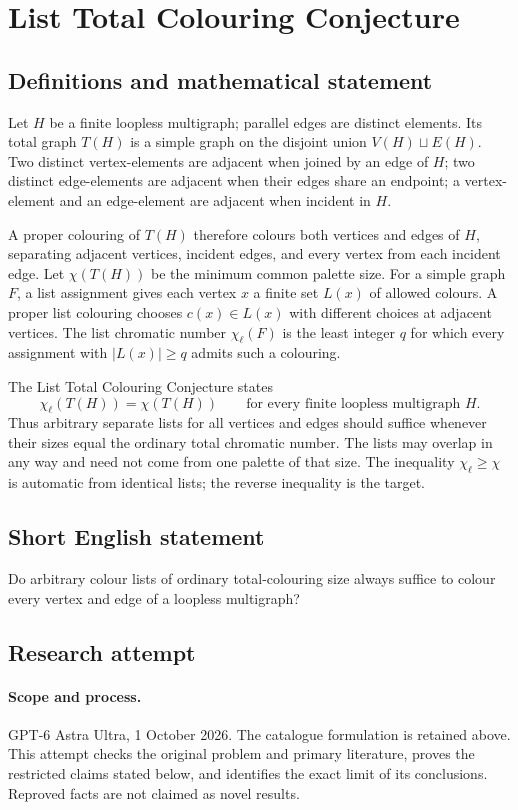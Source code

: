 \documentclass[11pt,a4paper]{article}
\begin{document}
\section*{List Total Colouring Conjecture}\label{statement}

\subsection{Definitions and mathematical statement}
Let $H$ be a finite loopless multigraph; parallel
edges are distinct elements. Its total graph
$T(H)$ is a simple graph on the disjoint union
$V(H)\sqcup E(H)$. Two distinct vertex-elements
are adjacent when joined by an edge of $H$;
two distinct edge-elements are adjacent when
their edges share an endpoint; a vertex-element
and an edge-element are adjacent when incident
in $H$.

A proper colouring of $T(H)$ therefore colours
both vertices and edges of $H$, separating
adjacent vertices, incident edges, and every
vertex from each incident edge. Let
$\chi(T(H))$ be the minimum common palette size.
For a simple graph $F$, a list assignment gives
each vertex $x$ a finite set $L(x)$ of allowed
colours. A proper list colouring chooses
$c(x)\in L(x)$ with different choices at
adjacent vertices. The list chromatic number
$\chi_\ell(F)$ is the least integer $q$ for
which every assignment with $|L(x)|\geq q$
admits such a colouring.

The List Total Colouring Conjecture states
\[
 \chi_\ell(T(H))=\chi(T(H))
 \qquad\text{for every finite loopless multigraph }H.
\]
Thus arbitrary separate lists for all vertices
and edges should suffice whenever their sizes
equal the ordinary total chromatic number.
The lists may overlap in any way and need not
come from one palette of that size. The inequality
$\chi_\ell\geq\chi$ is automatic from identical
lists; the reverse inequality is the target.
\subsection{Short English statement}
Do arbitrary colour lists of ordinary total-colouring size always suffice to colour every vertex and edge of a loopless multigraph?
\subsection{Research attempt}
\paragraph{Scope and process.}
GPT-6 Astra Ultra, 1 October 2026. The catalogue formulation is retained above. This attempt checks the original problem and primary literature, proves the restricted claims stated below, and identifies the exact limit of its conclusions. Reproved facts are not claimed as novel results.
\end{document}
